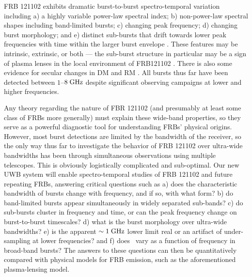 \documentclass[10pt]{myNSF}
\begin{document}
FRB 121102 exhibits dramatic burst-to-burst spectro-temporal variation
including a) a highly variable power-law spectral index; b)
non-power-law spectral shapes including band-limited bursts; c)
changing peak frequency; d) changing burst morphology; and e) distinct
sub-bursts that drift towards lower peak frequencies with time within
the larger burst envelope \citep{ssh+16b}.  These features may be
intrinsic, extrinsic, or both --- the sub-burst structure in
particular may be a sign of plasma lenses in the local environment of
FRB121102 \citep{cwh+17,myc+18}.  There is also some evidence for
secular changes in DM and RM \citep{msh+18,gsp+18}.  All bursts thus
far have been detected between $1$--$8\; \textrm{GHz}$ despite
significant observing campaigns at lower and higher frequencies.

Any theory regarding the nature of FBR 121102 (and presumably at least
some class of FRBs more generally) must explain these wide-band
properties, so they serve as a powerful diagnostic tool for
understanding FRBs' physical origins.  However, most burst detections
are limited by the bandwidth of the receiver, so the only way thus far
to investigate the behavior of FRB 121102 over ultra-wide bandwidths
has been through simultaneous observations using multiple telescopes.
This is obviously logistically complicated and sub-optimal.  Our new
UWB system will enable spectro-temporal studies of FRB 121102 and
future repeating FRBs, answering critical questions such as a) does
the characteristic bandwidth of bursts change with frequency, and if
so, with what form? b) do band-limited bursts appear simultaneously in
widely separated sub-bands? c) do sub-bursts cluster in frequency and
time, or can the peak frequency change on burst-to-burst timescales?
d) what is the burst morphology over ultra-wide bandwidths? e) is the
apparent $\sim 1\; \textrm{GHz}$ lower limit real or an artifact of
under-sampling at lower frequencies? and f) does \DM\ vary as a
function of frequency in broad-band bursts?  The answers to these
questions can then be quantitatively compared with physical models for
FRB emission, such as the aforementioned plasma-lensing model.
\end{document}
